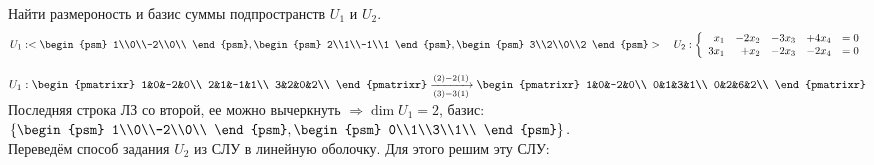 \begin{prim}
Найти размероность и базис суммы подпространств $U_1$ и $U_2$.
$$
U_1:<
\begin{psm}
1\\0\\-2\\0\\
\end{psm}
,
\begin{psm}
2\\1\\-1\\1
\end{psm}
,
\begin{psm}
3\\2\\0\\2
\end{psm}
>
\quad
U_2:
\left\{
\begin{array}{rrrrl}
x_1&-2x_2&-3x_3&+4x_4&=0\\
3x_1&+x_2&-2x_3&-2x_4&=0\\
\end{array}
\right.
$$
\end{prim}
$
U_1:
\begin{pmatrixr}
1&0&-2&0\\
2&1&-1&1\\
3&2&0&2\\
\end{pmatrixr}
\xrightarrow[(3)-3(1)]{(2)-2(1)}
\begin{pmatrixr}
1&0&-2&0\\
0&1&3&1\\
0&2&6&2\\
\end{pmatrixr}
$\\
Последняя строка ЛЗ со второй, ее можно вычеркнуть $\Rightarrow \dim U_1 = 2$, базис:
$\left\{
\begin{psm}
1\\0\\-2\\0\\
\end{psm}
,
\begin{psm}
0\\1\\3\\1\\
\end{psm}
\right\}.
$\\
Переведём способ задания $U_2$ из СЛУ в линейную оболочку. Для этого решим эту СЛУ:\\
